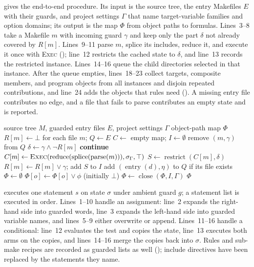 \documentclass[acmsmall,screen,review]{acmart}
\begin{document}
 gives the end-to-end procedure. Its input is the source tree, the entry Makefiles $E$ with their guards, and project settings $\Gamma$ that name target-variable families and option domains; its output is the map $\Phi$ from object paths to formulas. Lines~3--8 take a Makefile $m$ with incoming guard $\gamma$ and keep only the part $\delta$ not already covered by $R[m]$. Lines~9--11 parse $m$, splice its includes, reduce it, and execute it once with \textsc{Exec} (); line~12 restricts the cached state to $\delta$, and line~13 records the restricted instance. Lines~14--16 queue the child directories selected in that instance. After the queue empties, lines~18--23 collect targets, composite members, and program objects from all instances and disjoin repeated contributions, and line~24 adds the objects that rules need (). A missing entry file contributes no edge, and a file that fails to parse contributes an empty state and is reported.

\begin{algorithm}[t]
\caption{Extract guarded Kbuild object conditions}
\label{alg:extract}
\begin{algorithmic}[1]
\Require source tree $M$, guarded entry files $E$, project settings $\Gamma$
\Ensure object-path map $\Phi$
\State $R[m]\gets\bot$ for each file $m$; $Q\gets E$
\State $C\gets$ empty map; $I\gets\emptyset$
  \State remove $(m,\gamma)$ from $Q$
  \State $\delta\gets\gamma\land\neg R[m]$
    \State \textbf{continue}
  \EndIf
    \State $C[m]\gets\textsc{Exec}(\operatorname{reduce}(\operatorname{splice}(\operatorname{parse}(m))),\sigma_\Gamma,\top)$
  \EndIf
  \State $S\gets\operatorname{restrict}(C[m],\delta)$
  \State $R[m]\gets R[m]\lor\gamma$; add $S$ to $I$
    \State add $(\operatorname{entry}(d),\eta)$ to $Q$ if its file exists
  \EndFor
\EndWhile
\State $\Phi\gets\emptyset$
    \State $\Phi[o]\gets\Phi[o]\lor\phi$ (initially $\bot$)
  \EndFor
\EndFor
\State $\Phi\gets\operatorname{close}(\Phi, I, \Gamma)$ 
\State \Return $\Phi$
\end{algorithmic}
\end{algorithm}

 executes one statement $s$ on state $\sigma$ under ambient guard $g$; a statement list is executed in order. Lines~1--10 handle an assignment: line~2 expands the right-hand side into guarded words, line~3 expands the left-hand side into guarded variable names, and lines~5--9 either overwrite or append. Lines~11--16 handle a conditional: line~12 evaluates the test and copies the state, line~13 executes both arms on the copies, and lines~14--16 merge the copies back into $\sigma$. Rules and sub-make recipes are recorded as guarded lists as well (); include directives have been replaced by the statements they name.
\end{document}
